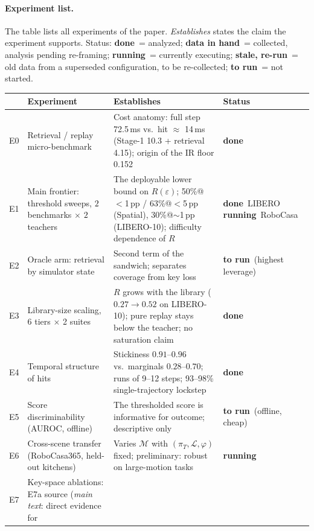 \documentclass{article}
\newcommand{\DONE}{\colorbox{green!18}{\scriptsize\textbf{done}}}
\newcommand{\RUNNING}{\colorbox{orange!25}{\scriptsize\textbf{running}}}
\newcommand{\TORUN}{\colorbox{red!15}{\scriptsize\textbf{to run}}}
\newcommand{\STALE}{\colorbox{gray!20}{\scriptsize\textbf{stale, re-run}}}
\newcommand{\INHAND}{\colorbox{green!18}{\scriptsize\textbf{data in hand}}}
\begin{document}
\paragraph{Experiment list.}
The table lists all experiments of the paper. \emph{Establishes} states the
claim the experiment supports. Status: \DONE\ = analyzed; \INHAND\ = collected, analysis pending
re-framing; \RUNNING\ = currently executing; \STALE\ = old data from a
superseded configuration, to be re-collected; \TORUN\ = not started.

\begin{table}[h]
\centering
\small
\begin{tabular}{@{}l p{4.6cm} p{4.2cm} l@{}}
\toprule
 & Experiment & Establishes & Status \\
\midrule
E0 & Retrieval / replay micro-benchmark & Cost anatomy: full step 72.5\,ms vs.\
     hit $\approx$ 14\,ms (Stage-1 10.3 + retrieval 4.15); origin of the
     $\mathrm{IR}$ floor 0.152 & \DONE \\
\addlinespace
\rowcolor{blue!7}
E1 & Main frontier: threshold sweeps, $2$ benchmarks $\times$ $2$ teachers &
     The deployable lower bound on $R(\varepsilon)$; 50\%@$<$1\,pp /
     63\%@$<$5\,pp (Spatial), 30\%@$\sim$1\,pp (LIBERO-10); difficulty
     dependence of $R$ & \DONE\ LIBERO \; \RUNNING\ RoboCasa \\
\addlinespace
\rowcolor{blue!7}
E2 & Oracle arm: retrieval by simulator state & Second term of the sandwich;
     separates coverage from key loss & \TORUN\ {\scriptsize(highest leverage)} \\
\addlinespace
E3 & Library-size scaling, 6 tiers $\times$ 2 suites & $R$ grows with the
     library ($0.27 \to 0.52$ on LIBERO-10); pure replay stays below the
     teacher; no saturation claim & \DONE \\
\addlinespace
E4 & Temporal structure of hits & Stickiness $0.91$--$0.96$ vs.\ marginals
     $0.28$--$0.70$; runs of 9--12 steps; 93--98\% single-trajectory lockstep & \DONE \\
\addlinespace
E5 & Score discriminability (AUROC, offline) & The thresholded score is
     informative for outcome; descriptive only & \TORUN\ {\scriptsize(offline, cheap)} \\
\addlinespace
E6 & Cross-scene transfer (RoboCasa365, held-out kitchens) & Varies
     $\mathcal{M}$ with $(\pi_T, \mathcal{L}, \varphi)$ fixed; preliminary:
     robust on large-motion tasks & \RUNNING \\
\addlinespace
E7 & Key-space ablations: E7a source (\emph{main text}: direct evidence for

\end{tabular}
\end{table}
\end{document}
